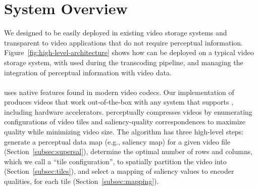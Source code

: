 
\section{\name System Overview}

We designed \name to be easily deployed in existing video storage systems and transparent to video applications that do not require perceptual information.
Figure~\ref{fig:high-level-architecture} shows how \name can be deployed on a typical video storage system, with \nameCompress used during the transcoding pipeline, and \nameStore managing the integration of perceptual information with video data.

\architectureOverviewFigure



\paragraph{\nameCompress} uses native features found in modern video codecs.
Our implementation of \nameCompress produces videos that work out-of-the-box with any system that supports \hevc, including hardware accelerators.
\nameCompress perceptually compresses videos by enumerating configurations of video tiles and saliency-quality correspondences to maximize quality while minimizing video size.
The algorithm has three high-level steps: generate a perceptual data map (e.g., saliency map) for a given video file (Section~\ref{subsec:supersal}), determine the optimal number of rows and columns, which we call a ``tile configuration'', to spatially partition the video into (Section~\ref{subsec:tiles}), and select a mapping of saliency values to encoder qualities, for each tile (Section~\ref{subsec:mapping}).

